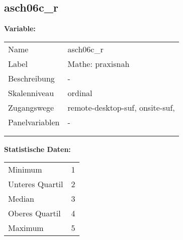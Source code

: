 	
	
	\subsection{asch06c\_r}
	\label{subSection:asch06c_r}

	\noindent\textbf{Variable:}\\
		\begin{tabular}{lL{11.3cm}}
			\label{tableVariable:asch06c_r}
			Name & asch06c\_r \\
			Label & Mathe: praxisnah \\
			Beschreibung & - \\
			Skalenniveau & ordinal \\
			Zugangswege &
				remote-desktop-suf,
				onsite-suf,
 \\
			Panelvariablen & -
			 \\
			 \\
 \\
		\end{tabular}



		\vspace*{1 cm}
		\noindent\textbf{Statistische Daten:}\\
			\begin{tabular}{ll}
				\label{tableStatistics:asch06c_r}
					Minimum & 1 \\
					Unteres Quartil & 2 \\
					Median & 3 \\
					Oberes Quartil & 4 \\
					Maximum & 5 \\
			\end{tabular}



